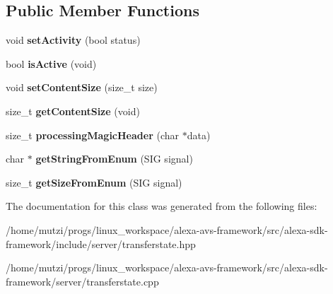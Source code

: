 \subsection*{Public Member Functions}
\begin{DoxyCompactItemize}
\item 
\mbox{\label{classServer_1_1TransferState_a25998c7c6b815c27df88a0f7df64e9e6}} 
void {\bfseries set\+Activity} (bool status)
\item 
\mbox{\label{classServer_1_1TransferState_ae0b397e23cf6899c3a39b25801d92ab1}} 
bool {\bfseries is\+Active} (void)
\item 
\mbox{\label{classServer_1_1TransferState_a5560f98fe083229144e07e7824cae6eb}} 
void {\bfseries set\+Content\+Size} (size\+\_\+t size)
\item 
\mbox{\label{classServer_1_1TransferState_aff0558ad7e1f9b62355aebf5ea8dbd2a}} 
size\+\_\+t {\bfseries get\+Content\+Size} (void)
\item 
\mbox{\label{classServer_1_1TransferState_a034c2a4d731c62a1b25199bab352a09d}} 
size\+\_\+t {\bfseries processing\+Magic\+Header} (char $\ast$data)
\item 
\mbox{\label{classServer_1_1TransferState_a4a21f691ccce4c9f58bedceb285031c8}} 
char $\ast$ {\bfseries get\+String\+From\+Enum} (S\+IG signal)
\item 
\mbox{\label{classServer_1_1TransferState_afa4ab2836cdee3ec94490db425cbbf71}} 
size\+\_\+t {\bfseries get\+Size\+From\+Enum} (S\+IG signal)
\end{DoxyCompactItemize}


The documentation for this class was generated from the following files\+:\begin{DoxyCompactItemize}
\item 
/home/mutzi/progs/linux\+\_\+workspace/alexa-\/avs-\/framework/src/alexa-\/sdk-\/framework/include/server/transferstate.\+hpp\item 
/home/mutzi/progs/linux\+\_\+workspace/alexa-\/avs-\/framework/src/alexa-\/sdk-\/framework/server/transferstate.\+cpp\end{DoxyCompactItemize}

